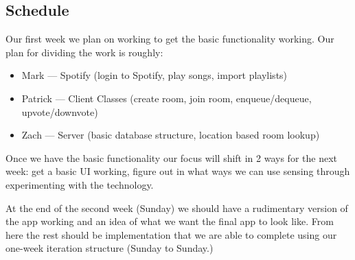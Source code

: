 \documentclass[12pt]{article}
\begin{document}
\subsection{Schedule}
Our first week we plan on working to get the basic functionality
working. Our plan for dividing the work is roughly:

\begin{itemize}
\item Mark --- Spotify (login to Spotify, play songs, import playlists)
\item Patrick --- Client Classes (create room, join room, enqueue/dequeue, upvote/downvote)
\item Zach --- Server (basic database structure,  location based room lookup)
\end{itemize}


Once we have the basic functionality our focus will shift in 2 ways
for the next week: get a basic UI working, figure out in what ways we
can use sensing through experimenting with the technology.


At the end of the second week (Sunday) we should have a rudimentary
version of the app working and an idea of what we want the final app
to look like. From here the rest should be implementation that we are
able to complete using our one-week iteration structure (Sunday to
Sunday.)
\end{document}
